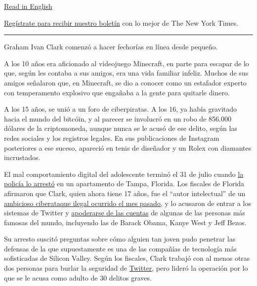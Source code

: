 \href{https://www.nytimes3xbfgragh.onion/2020/08/02/technology/florida-teenager-twitter-hack.html}{Read
in English}

\href{https://www.nytimes3xbfgragh.onion/newsletters/el-times}{Regístrate
para recibir nuestro boletín} con lo mejor de The New York Times.

\begin{center}\rule{0.5\linewidth}{\linethickness}\end{center}

Graham Ivan Clark comenzó a hacer fechorías en línea desde pequeño.

A los 10 años era aficionado al videojuego Minecraft, en parte para
escapar de lo que, según les contaba a sus amigos, era una vida familiar
infeliz. Muchos de sus amigos señalaron que, en Minecraft, se dio a
conocer como un estafador experto con temperamento explosivo que
engañaba a la gente para quitarle dinero.

A los 15 años, se unió a un foro de ciberpiratas. A los 16, ya había
gravitado hacia el mundo del bitcóin, y al parecer se involucró en un
robo de 856.000 dólares de la criptomoneda, aunque nunca se le acusó de
ese delito, según las redes sociales y los registros legales. En sus
publicaciones de Instagram posteriores a ese suceso, apareció en tenis
de diseñador y un Rolex con diamantes incrustados.

El mal comportamiento digital del adolescente terminó el 31 de julio
cuando
\href{https://www.nytimes3xbfgragh.onion/2020/07/31/technology/twitter-hack-arrest.html}{la
policía lo arrestó} en un apartamento de Tampa, Florida. Los fiscales de
Florida afirmaron que Clark, quien ahora tiene 17 años, fue el ``autor
intelectual'' de un
\href{https://www.nytimes3xbfgragh.onion/2020/07/17/technology/twitter-hackers-interview.html}{ambicioso
ciberataque ilegal ocurrido el mes pasado}, y lo acusaron de entrar a
los sistemas de Twitter y
\href{https://www.nytimes3xbfgragh.onion/2020/07/15/technology/twitter-hack-bill-gates-elon-musk.html}{apoderarse
de las cuentas} de algunas de las personas más famosas del mundo,
incluyendo las de Barack Obama, Kanye West y Jeff Bezos.

Su arresto suscitó preguntas sobre cómo alguien tan joven pudo penetrar
las defensas de la que supuestamente es una de las compañías de
tecnología más sofisticadas de Silicon Valley. Según los fiscales, Clark
trabajó con al menos otras dos personas para burlar la seguridad de
\href{https://www.nytimes3xbfgragh.onion/2020/08/03/technology/ftc-twitter-privacy-violations.html}{Twitter},
pero lideró la operación por lo que se le acusa como adulto de 30
delitos graves.


